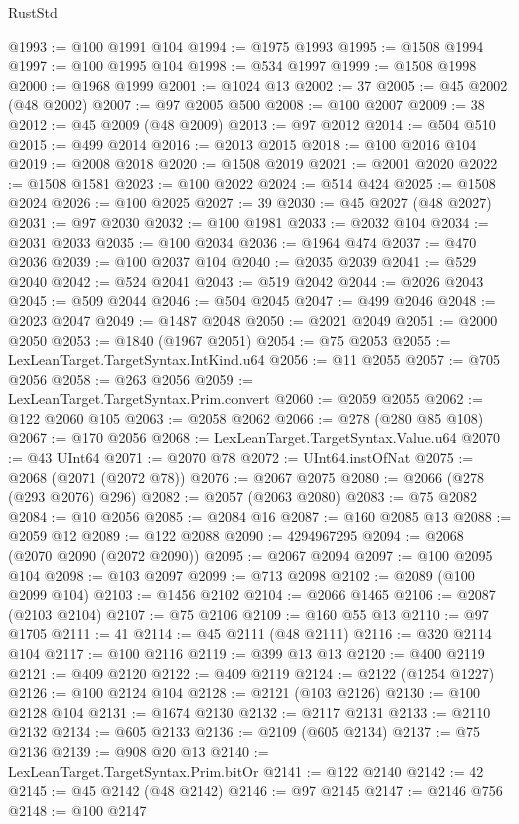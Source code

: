 \begin{lexlean}{RustStd}
\begin{coremodule}
@1993 := @100 @1991 @104
@1994 := @1975 @1993
@1995 := @1508 @1994
@1997 := @100 @1995 @104
@1998 := @534 @1997
@1999 := @1508 @1998
@2000 := @1968 @1999
@2001 := @1024 @13
@2002 := 37
@2005 := @45 @2002 (@48 @2002)
@2007 := @97 @2005 @500
@2008 := @100 @2007
@2009 := 38
@2012 := @45 @2009 (@48 @2009)
@2013 := @97 @2012
@2014 := @504 @510
@2015 := @499 @2014
@2016 := @2013 @2015
@2018 := @100 @2016 @104
@2019 := @2008 @2018
@2020 := @1508 @2019
@2021 := @2001 @2020
@2022 := @1508 @1581
@2023 := @100 @2022
@2024 := @514 @424
@2025 := @1508 @2024
@2026 := @100 @2025
@2027 := 39
@2030 := @45 @2027 (@48 @2027)
@2031 := @97 @2030
@2032 := @100 @1981
@2033 := @2032 @104
@2034 := @2031 @2033
@2035 := @100 @2034
@2036 := @1964 @474
@2037 := @470 @2036
@2039 := @100 @2037 @104
@2040 := @2035 @2039
@2041 := @529 @2040
@2042 := @524 @2041
@2043 := @519 @2042
@2044 := @2026 @2043
@2045 := @509 @2044
@2046 := @504 @2045
@2047 := @499 @2046
@2048 := @2023 @2047
@2049 := @1487 @2048
@2050 := @2021 @2049
@2051 := @2000 @2050
@2053 := @1840 (@1967 @2051)
@2054 := @75 @2053
@2055 := LexLeanTarget.TargetSyntax.IntKind.u64
@2056 := @11 @2055
@2057 := @705 @2056
@2058 := @263 @2056
@2059 := LexLeanTarget.TargetSyntax.Prim.convert
@2060 := @2059 @2055
@2062 := @122 @2060 @105
@2063 := @2058 @2062
@2066 := @278 (@280 @85 @108)
@2067 := @170 @2056
@2068 := LexLeanTarget.TargetSyntax.Value.u64
@2070 := @43 UInt64
@2071 := @2070 @78
@2072 := UInt64.instOfNat
@2075 := @2068 (@2071 (@2072 @78))
@2076 := @2067 @2075
@2080 := @2066 (@278 (@293 @2076) @296)
@2082 := @2057 (@2063 @2080)
@2083 := @75 @2082
@2084 := @10 @2056
@2085 := @2084 @16
@2087 := @160 @2085 @13
@2088 := @2059 @12
@2089 := @122 @2088
@2090 := 4294967295
@2094 := @2068 (@2070 @2090 (@2072 @2090))
@2095 := @2067 @2094
@2097 := @100 @2095 @104
@2098 := @103 @2097
@2099 := @713 @2098
@2102 := @2089 (@100 @2099 @104)
@2103 := @1456 @2102
@2104 := @2066 @1465
@2106 := @2087 (@2103 @2104)
@2107 := @75 @2106
@2109 := @160 @55 @13
@2110 := @97 @1705
@2111 := 41
@2114 := @45 @2111 (@48 @2111)
@2116 := @320 @2114 @104
@2117 := @100 @2116
@2119 := @399 @13 @13
@2120 := @400 @2119
@2121 := @409 @2120
@2122 := @409 @2119
@2124 := @2122 (@1254 @1227)
@2126 := @100 @2124 @104
@2128 := @2121 (@103 @2126)
@2130 := @100 @2128 @104
@2131 := @1674 @2130
@2132 := @2117 @2131
@2133 := @2110 @2132
@2134 := @605 @2133
@2136 := @2109 (@605 @2134)
@2137 := @75 @2136
@2139 := @908 @20 @13
@2140 := LexLeanTarget.TargetSyntax.Prim.bitOr
@2141 := @122 @2140
@2142 := 42
@2145 := @45 @2142 (@48 @2142)
@2146 := @97 @2145
@2147 := @2146 @756
@2148 := @100 @2147

\end{coremodule}
\end{lexlean}
